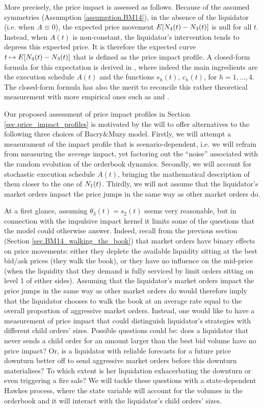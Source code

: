 \documentclass[10pt, article,table]{article}
\begin{document}
More precisely, the price impact is assessed as follows. Because of the assumed symmetries (Assumption \ref{assumption.BM14}), in the absence of the liquidator (i.e. when $A\equiv 0$), the expected price movement $\Expectation [\countingProc[4](t) - \countingProc[3](t)]$ is null for all $t$. Instead, when $A(t)$ is non-constant,  the liquidator's intervention tends to depress this expected price. It is therefore the expected curve $t\mapsto \Expectation[\countingProc[4](t)-\countingProc[3](t)]$ that is defined as the price impact profile. A closed-form formula for this expectation is derived in \citealp[Propositon 5.1 and Corollary 5.2]{BM14haw}, where indeed the main ingredients are the execution schedule $A(t)$ and the functions $s_h(t)$, $c_h(t)$, for $h=1,\dots,4$. The closed-form formula has also the merit to reconcile this rather theoretical measurement with more empirical ones such as \citealp{BN13mar} and  \citealp{MVMGFVLM09mar}.  

Our proposed assessment of price impact profiles in Section \ref{sec.price_impact_profiles} is motivated by the will to offer alternatives to the following three choices of Bacry\&Muzy model. Firstly, we will attempt a measurament of the impact profile that is scenario-dependent, i.e. we will refrain from measuring the \emph{average} impact, yet factoring out the ``noise'' associated with the random evolution of the orderbook dynamics. Secondly, we will account for stochastic execution schedule $A(t)$, bringing the mathematical description of them closer to the one of $\countingProc[1](t)$. Thirdly, we will not assume that the liquidator's market orders impact the price jumps in the same way as other market orders do.

At a first glance, assuming $\theta_3(t) = s_2(t)$ seems very reasonable, but in connection with the impulsive impact kernel it limits some of the questions that the model could otherwise answer. Indeed, recall from the previous section (Section \ref{sec.BM14_walking_the_book}) that market orders have binary effects on price movements: either they deplete the available liquidity sitting at the best bid/ask prices (they walk the book), or they have no influence on the mid-price (when the liquidity that they demand is fully serviced by limit orders sitting on level 1 of either sides). Assuming that the liquidator's market orders impact the price jumps in the same way as other market orders do would therefore imply that the liquidator chooses to walk the book at an average rate equal to the overall proportion of aggressive market orders. Instead, one would like to have a measurement of price impact that could distinguish liquidator's strategies with different child orders' sizes. Possible questions could be: does a liquidator that never sends a child order for an amount larger than the best bid volume have no price impact? Or, is a liquidator with reliable forecasts for a future price downturn better off to send aggressive market orders before this downturn materialises? To which extent is her liquidation exhacerbating the downturn or even triggering a fire sale? We will tackle these questions with a state-dependent Hawkes process, where the state variable will account for the volumes in the orderbook and it will interact with the liquidator's child orders' sizes. 
 
\end{document}
